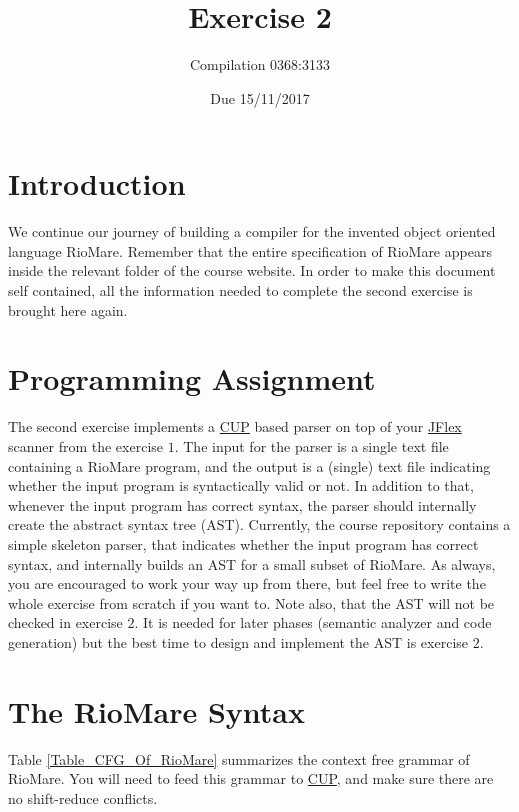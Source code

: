 \documentclass{article}
\begin{document}
\title{Exercise 2}
\author{Compilation 0368:3133}
\date{Due 15/11/2017}
\maketitle

\section{Introduction}
We continue our journey of building a compiler
for the invented object oriented language RioMare.
Remember that the entire specification of RioMare appears
inside the relevant folder of the course website.
In order to make this document self contained,
all the information needed to complete the second exercise is brought here again.

\section{Programming Assignment}
The second exercise implements a \href{http://www2.cs.tum.edu/projects/cup/}{CUP} based
parser on top of your \href{http://jflex.de/}{JFlex} scanner from the exercise $1$.
The input for the parser is a single text file containing a RioMare program,
and the output is a (single) text file indicating whether the input program
is syntactically valid or not. In addition to that,
whenever the input program has correct syntax,
the parser should internally create the abstract syntax tree (AST).
Currently, the course repository contains a simple skeleton
parser, that indicates whether the input program has correct syntax,
and internally builds an AST for a small subset of RioMare.
As always, you are encouraged to work your way up from there,
but feel free to write the whole exercise from scratch if you want to.
Note also, that the AST will not be checked in exercise $2$.
It is needed for later phases (semantic analyzer and code generation)
but the best time to design and implement the AST is exercise $2$.
 
\section{The RioMare Syntax}
Table \ref{Table_CFG_Of_RioMare} summarizes the context free grammar of RioMare.
You will need to feed this grammar to \href{http://www2.cs.tum.edu/projects/cup/}{CUP},
and make sure there are no shift-reduce conflicts.  
\end{document}
